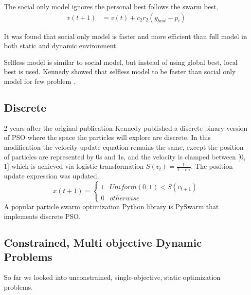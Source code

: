 \documentclass{article}
\begin{document}
The social only model ignores the personal best follows the swarm best,
\begin{align*}
v(t+1) &= v(t) + c_2r_2(g_{best} - p_i) 
\end{align*}

It was found that social only model is faster and more efficient than full model in both static and dynamic environment. \cite{kennedy1997particle, carlisle2000adapting}

Selfless model is similar to social model, but instead of using global best, local best is used. Kennedy showed that selfless model to be faster than social only model for few problem \cite{kennedy1997particle}.

\subsection{Discrete}
2 years after the original publication Kennedy \cite{kennedy1997discrete} published a discrete binary version of PSO where the space the particles will explore are discrete. In this modification the velocity update equation remains the same, except the position of particles are represented by 0s and 1s, and the velocity is clamped between [0, 1] which is achieved via logistic transformation $S(v_t) = \frac{1}{1 - e^{v_t}}$. The position update expression was updated,
\begin{equation}
x(t+1) = 
\begin{cases} 
1 & Uniform(0,1) < S(v_{t+1}) \\ 
0 & otherwise 
\end{cases}
\end{equation}
A popular particle swarm optimization Python library is PySwarm that implements discrete PSO.\cite{pyswarms.discrete}

\subsection{Constrained, Multi objective Dynamic Problems}
So far we looked into unconstrained, single-objective, static optimization problems. 
\end{document}
